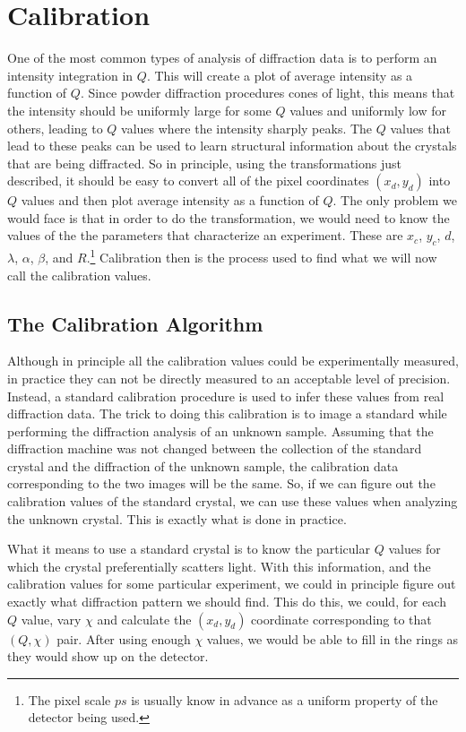\chapter{Calibration}\label{calibration}

One of the most common types of analysis of diffraction data
is to perform an intensity integration in $Q$. This will 
create a plot of average intensity as a function of $Q$.
Since powder diffraction procedures cones of light, this means
that the intensity should be uniformly large for some $Q$
values and uniformly low for others, leading to $Q$ values
where the intensity sharply peaks. The $Q$ values that lead 
to these peaks can be used to learn structural information
about the crystals that are being diffracted. So in principle,
using the transformations just described, it should be easy
to convert all of the pixel coordinates $(x_d,y_d)$ into
$Q$ values and then plot average intensity as a function of
$Q$. The only problem we would face is that in order to do
the transformation, we would need to know the values of the
the parameters that characterize an experiment. These are
\index{$\alpha$}\index{$\beta$}
$x_c$, $y_c$, $d$, $\lambda$, $\alpha$, $\beta$, and 
$R$.\footnote{The pixel scale $ps$ is usually know in advance 
as a uniform property of the detector being used.} Calibration
then is the process used to find what we will now call the
calibration values.

\section{The Calibration Algorithm}\label{cal_algorithm}

Although in principle all the calibration values could be
experimentally measured, in practice they can not be
directly measured to an acceptable level of precision. 
Instead, a standard calibration procedure is used to 
infer these values from real diffraction data. The 
trick to doing this calibration is to image a standard
while performing the diffraction analysis of an 
unknown sample. Assuming that the diffraction machine
was not changed between the collection of the 
standard crystal and the diffraction of the unknown sample, 
the calibration data corresponding to the two 
images will be the same. So, if we can figure out the
calibration values of the standard crystal, we can
use these values when analyzing the unknown crystal.
This is exactly what is done in practice.

What it means to use a standard crystal is to know the
particular $Q$ values for which the crystal preferentially
scatters light. With this information, and the 
calibration values for some particular experiment,
we could in principle figure out exactly what diffraction
pattern we should find. This do this, we could, for
each $Q$ value, vary $\chi$ and calculate the 
$(x_d,y_d)$ coordinate corresponding to that $(Q,\chi)$
pair. After using enough $\chi$ values, we would be 
able to fill in the rings as they would show up on 
the detector.

